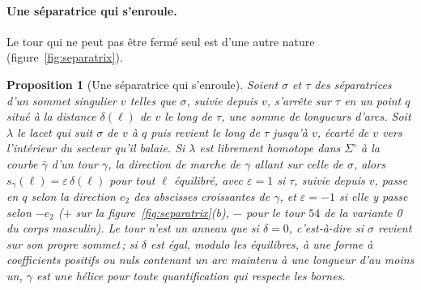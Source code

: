 \documentclass[11pt,a4paper]{article}
\newtheorem{proposition}{Proposition}
\newcommand{\shift}{s}
\newcommand{\lean}[1]{\texttt{\detokenize{#1}}}
\newenvironment{evidence}[3][]{}{}
\begin{document}
\begin{table}[t]
\begin{evidence}[unbreakable]{measured}{sur l'export du corps masculin}
\caption{Les conflits entre deux tours sur le corps masculin (mesuré), par
ligne du tableau~\ref{tab:iis}. Les numéros des tours sont ceux de la
première variante indiquée\,; «~entre les tours~»~: les sommets singuliers,
numérotés comme nœuds et de valence trois sauf mention, autour desquels
s'enroule la combinaison des deux courbes\,; «~escalier~»~: le plus court
trouvé entre deux d'entre eux dont la longueur est égale à la combinaison
modulo les équilibres, ses arcs, sa longueur, et si l'arc maintenu du
certificat est dessus ou atteint par les équilibres. Dislocation~:
propositions~\ref{prop:dislocation}(i) et~\ref{prop:staircase}\,;
échange~: propositions~\ref{prop:swap} et~\ref{prop:staircase}\,; dans les
deux cas, l'homotopie vérifiée par ordinateur. Escalier seul~: l'identité des
formes est vraie, l'homotopie de la proposition~\ref{prop:swap} ne l'est
pas.}
\label{tab:pairs}
\end{evidence}
\end{table}

\paragraph{Une séparatrice qui s'enroule.}
Le tour qui ne peut pas être fermé seul est d'une autre nature
(figure~\ref{fig:separatrix}).

\begin{evidence}{prose}{une étape en Lean, la conjugaison~: \lean{Motion.conj_translation}\,; sur 25 séparatrices qui s'enroulent de tores aléatoires, aucun strip voisin n'a eu le décalage $\delta$, l'homotopie n'étant pas vérifiée}
\begin{proposition}[Une séparatrice qui s'enroule]\label{prop:winding}
Soient $\sigma$ et $\tau$ des séparatrices d'un sommet singulier $v$ telles
que $\sigma$, suivie depuis $v$, s'arrête sur $\tau$ en un point $q$ situé à
la distance $\delta(\ell)$ de $v$ le long de $\tau$, une somme de longueurs
d'arcs. Soit $\lambda$ le lacet qui suit $\sigma$ de $v$ à $q$ puis revient le
long de $\tau$ jusqu'à $v$, écarté de $v$ vers l'intérieur du secteur qu'il
balaie. Si $\lambda$ est librement homotope dans $\Sigma^\circ$ à la courbe
$\bar\gamma$ d'un tour $\gamma$, la direction de marche de $\gamma$ allant sur
celle de $\sigma$, alors $\shift_\gamma(\ell) = \varepsilon\,\delta(\ell)$ pour
tout $\ell$ équilibré, avec $\varepsilon = 1$ si $\tau$, suivie depuis $v$,
passe en $q$ selon la direction $e_2$ des abscisses croissantes de $\gamma$, et
$\varepsilon = -1$ si elle y passe selon $-e_2$ ($+$ sur la
figure~\ref{fig:separatrix}(b), $-$ pour le tour $54$ de la variante 0 du
corps masculin). Le tour n'est un anneau que si $\delta = 0$, c'est-à-dire si
$\sigma$ revient sur son propre sommet\,; si $\delta$ est égal, modulo les
équilibres, à une forme à coefficients positifs ou nuls contenant un arc
maintenu à une longueur d'au moins un, $\gamma$ est une hélice pour toute
quantification qui respecte les bornes.
\end{proposition}
\end{evidence}
\end{document}
